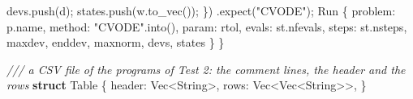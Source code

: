 \documentclass[
  10pt,
]{article}
\newenvironment{Shaded}{}{}
\newcommand{\CommentTok}[1]{\textcolor[rgb]{0.38,0.63,0.69}{\textit{#1}}}
\newcommand{\DataTypeTok}[1]{\textcolor[rgb]{0.56,0.13,0.00}{#1}}
\newcommand{\KeywordTok}[1]{\textcolor[rgb]{0.00,0.44,0.13}{\textbf{#1}}}
\newcommand{\NormalTok}[1]{#1}
\newcommand{\OperatorTok}[1]{\textcolor[rgb]{0.40,0.40,0.40}{#1}}
\newcommand{\StringTok}[1]{\textcolor[rgb]{0.25,0.44,0.63}{#1}}
\begin{document}
\begin{Shaded}
\begin{Highlighting}[]
\NormalTok{        devs}\OperatorTok{.}\NormalTok{push(d)}\OperatorTok{;}
\NormalTok{        states}\OperatorTok{.}\NormalTok{push(w}\OperatorTok{.}\NormalTok{to\_vec())}\OperatorTok{;}
    \OperatorTok{\}}\NormalTok{)}
    \OperatorTok{.}\NormalTok{expect(}\StringTok{"CVODE"}\NormalTok{)}\OperatorTok{;}
\NormalTok{    Run }\OperatorTok{\{}\NormalTok{ problem}\OperatorTok{:}\NormalTok{ p}\OperatorTok{.}\NormalTok{name}\OperatorTok{,}\NormalTok{ method}\OperatorTok{:} \StringTok{"CVODE"}\OperatorTok{.}\NormalTok{into()}\OperatorTok{,}\NormalTok{ param}\OperatorTok{:}\NormalTok{ rtol}\OperatorTok{,}\NormalTok{ evals}\OperatorTok{:}\NormalTok{ st}\OperatorTok{.}\NormalTok{nfevals}\OperatorTok{,}\NormalTok{ steps}\OperatorTok{:}\NormalTok{ st}\OperatorTok{.}\NormalTok{nsteps}\OperatorTok{,}\NormalTok{ maxdev}\OperatorTok{,}\NormalTok{ enddev}\OperatorTok{,}\NormalTok{ maxnorm}\OperatorTok{,}\NormalTok{ devs}\OperatorTok{,}\NormalTok{ states }\OperatorTok{\}}
\OperatorTok{\}}

\CommentTok{/// a CSV file of the programs of Test 2: the comment lines, the header and the rows}
\KeywordTok{struct}\NormalTok{ Table }\OperatorTok{\{}
\NormalTok{    header}\OperatorTok{:} \DataTypeTok{Vec}\OperatorTok{\textless{}}\DataTypeTok{String}\OperatorTok{\textgreater{},}
\NormalTok{    rows}\OperatorTok{:} \DataTypeTok{Vec}\OperatorTok{\textless{}}\DataTypeTok{Vec}\OperatorTok{\textless{}}\DataTypeTok{String}\OperatorTok{\textgreater{}\textgreater{},}
\OperatorTok{\}}


\end{Highlighting}
\end{Shaded}
\end{document}

